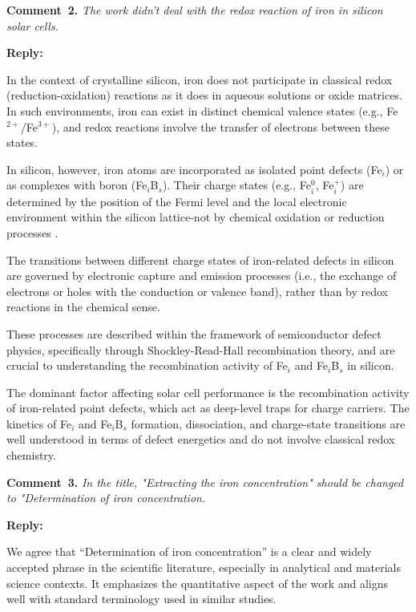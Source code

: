 \documentclass[a4paper,fleqn]{cas-sc}
\begin{document}
\vspace{1cm}
\noindent
\textcolor[rgb]{0.00,0.50,1.00}{\textbf{Comment~2.}}
\emph{The work didn't deal with the redox reaction of iron in silicon solar cells.}

\noindent
\textcolor[rgb]{0.51,0.00,0.00}{\textbf{Reply:}}

In the context of crystalline silicon, iron does not participate in classical redox (reduction-oxidation) reactions as it does in aqueous solutions or oxide matrices. 
In such environments, iron can exist in distinct chemical valence states (e.g., Fe$^{2+}$/Fe$^{3+}$), and redox reactions involve the transfer of electrons between these states.


In silicon, however, iron atoms are incorporated as isolated point defects (Fe$_i$) or as complexes with boron (Fe$_i$B$_s$). 
Their charge states (e.g., Fe$_i^0$, Fe$_i^+$) are determined by the position of the Fermi level and the local electronic environment within the silicon lattice-not by chemical oxidation or reduction processes \cite{weber1983}.


The transitions between different charge states of iron-related defects in silicon are governed by electronic capture and emission processes (i.e., the exchange of electrons or holes with the conduction or valence band), rather than by redox reactions in the chemical sense.


These processes are described within the framework of semiconductor defect physics, specifically through Shockley-Read-Hall recombination theory, and are crucial to understanding the recombination activity of Fe$_i$ and Fe$_i$B$_s$ in silicon.


The dominant factor affecting solar cell performance is the recombination activity of iron-related point defects, which act as deep-level traps for charge carriers. 
The kinetics of Fe$_i$ and Fe$_i$B$_s$ formation, dissociation, and charge-state transitions are well understood in terms of defect energetics and do not involve classical redox chemistry.


\vspace{1cm}
\noindent
\textcolor[rgb]{0.00,0.50,1.00}{\textbf{Comment~3.}}
\emph{In the title, "Extracting the iron concentration" should be changed to "Determination of iron concentration.}

\noindent
\textcolor[rgb]{0.51,0.00,0.00}{\textbf{Reply:}}

We agree that “Determination of iron concentration” is a clear and widely accepted phrase in the scientific literature, especially in analytical and materials science contexts. 
It emphasizes the quantitative aspect of the work and aligns well with standard terminology used in similar studies.
\end{document}
